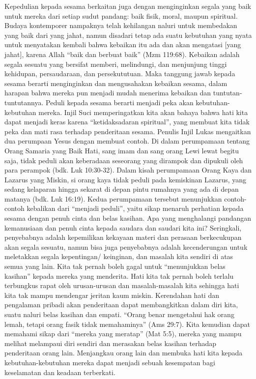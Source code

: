 Kepedulian kepada sesama berkaitan juga dengan menginginkan segala yang baik untuk mereka dari setiap sudut pandang: baik fisik, moral, maupun spiritual. Budaya kontemporer nampaknya telah kehilangan naluri untuk membedakan yang baik dari yang jahat, namun disadari tetap ada suatu kebutuhan yang nyata untuk menyatakan kembali bahwa kebaikan itu ada dan akan mengatasi [yang jahat], karena Allah ``baik dan berbuat baik'' (Mzm 119:68). Kebaikan adalah segala sesuatu yang bersifat memberi, melindungi, dan menjunjung tinggi kehidupan, persaudaraan, dan persekututuan. Maka tanggung jawab kepada sesama berarti menginginkan dan mengusahakan kebaikan sesama, dalam harapan bahwa mereka pun menjadi mudah menerima kebaikan dan tuntutan- tuntutannya. Peduli kepada sesama berarti menjadi peka akan kebutuhan-kebutuhan mereka. Injil Suci memperingatkan kita akan bahaya bahwa hati kita dapat menjadi keras karena ``ketidaksadaran spiritual'', yang membuat kita tidak peka dan mati rasa terhadap penderitaan sesama. Penulis Injil Lukas mengaitkan dua perumpaan Yesus dengan membuat contoh. Di dalam perumpamaan tentang Orang Samaria yang Baik Hati, sang imam dan sang orang Lewi lewat begitu saja,  tidak peduli akan keberadaan seseorang yang dirampok dan dipukuli oleh para perampok (bdk. Luk 10:30-32). Dalam kisah perumpamaan Orang Kaya dan Lazarus yang Miskin, si orang kaya tidak peduli pada kemiskinan Lazarus, yang sedang kelaparan hingga sekarat di depan pintu rumahnya yang ada di depan matanya (bdk. Luk 16:19). Kedua perumpamaan tersebut menunjukkan contoh-contoh kebalikan dari  ``menjadi peduli'', yaitu sikap menaruh perhatian kepada sesama dengan penuh cinta dan belas kasihan. Apa yang menghalangi pandangan kemanusiaan dan penuh cinta kepada saudara dan saudari kita ini? Seringkali, penyebabnya adalah kepemilikan kekayaan materi dan perasaan berkecukupan akan segala sesuatu, namun bisa juga penyebabnya adalah kecenderungan untuk meletakkan segala kepentingan/ keinginan, dan masalah kita sendiri di atas semua yang lain. Kita tak pernah boleh gagal untuk ``menunjukkan belas kasihan'' kepada mereka yang menderita. Hati kita tak pernah boleh terlalu terbungkus rapat oleh urusan-urusan dan masalah-masalah kita sehingga hati kita tak mampu mendengar jeritan kaum miskin. Kerendahan hati dan pengalaman pribadi akan penderitaan dapat membangkitkan dalam diri kita, suatu naluri belas kasihan dan empati. ``Orang benar mengetahui hak orang lemah, tetapi orang fasik tidak memahaminya'' (Ams 29:7). Kita kemudian dapat memahami sikap dari ``mereka yang meratap'' (Mat 5:5), mereka yang mampu melihat melampaui diri sendiri dan merasakan belas kasihan terhadap penderitaan orang lain. Menjangkau orang lain dan membuka hati kita kepada kebutuhan-kebutuhan mereka dapat menjadi sebuah kesempatan bagi  keselamatan dan keadaan terberkati.

